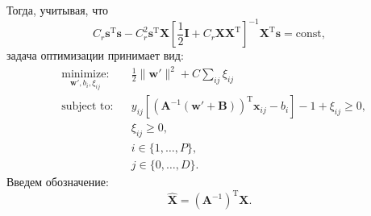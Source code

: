 \documentclass[12pt,twoside]{article}
\begin{document}
Тогда, учитывая, что 
\begin{equation*}
C_r\mathbf{s}^{\text{T}}\mathbf{s}-
C_r^2\mathbf{s}^{\text{T}}{\mathbf{X}}\left[\frac{1}{2}\mathbf{I} + C_{r}{\mathbf{X}}{\mathbf{X}}^{\text{T}}\right]^{-1}{\mathbf{X}}^{\text{T}}\mathbf{s}
=\text{const},
\end{equation*}
задача оптимизации принимает вид: 
\begin{equation}\label{eq17}
\begin{aligned}
& \underset{\mathbf{w}', b_i, \xi_{ij}}{\text{minimize:}}
& & \frac{1}{2} \|\mathbf{w}'\|^2 + C\sum\limits_{ij}\xi_{ij} \\
& \text{subject to:}
& & y_{ij}[\left(\mathbf{A}^{-1}\left(\mathbf{w}'+\mathbf{B}\right)\right)^{\text{T}}\mathbf{x}_{ij} - b_i]-1+\xi_{ij} \geq 0, \\
&&& \xi_{ij} \geq 0, \\
&&&i\in\{1,\dots,P\}, \\
&&&j\in\{0,\dots,D\}.
\end{aligned}
\end{equation}
Введем обозначение:
\begin{equation}\label{eq18}
\hat{\mathbf{X}} = (\mathbf{A}^{-1})^{\text{T}}\mathbf{X}.
\end{equation}
\end{document}
